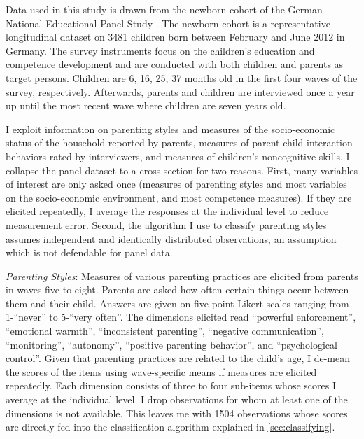 Data used in this study is drawn from the newborn cohort of the German National Educational Panel Study \parencite[NEPS][]{neps}. The newborn cohort is a representative longitudinal dataset on 3481 children born between February and June 2012 in Germany. The survey instruments focus on the children's education and competence development and are conducted with both children and parents as target persons. Children are 6, 16, 25, 37 months old in the first four waves of the survey, respectively. Afterwards, parents and children are interviewed once a year up until the most recent wave where children are seven years old. 

I exploit information on parenting styles and measures of the socio-economic status of the household reported by parents, measures of parent-child interaction behaviors rated by interviewers, and measures of children's noncognitive skills. I collapse the panel dataset to a cross-section for two reasons. First, many variables of interest are only asked once (measures of parenting styles and most variables on the socio-economic environment, and most competence measures). If they are elicited repeatedly, I average the responses at the individual level to reduce measurement error. Second, the algorithm I use to classify parenting styles assumes independent and identically distributed observations, an assumption which is not defendable for panel data.

\textit{Parenting Styles}: Measures of various parenting practices are elicited from parents in waves five to eight. Parents are asked how often certain things occur between them and their child. Answers are given on five-point Likert scales ranging from 1-``never'' to 5-``very often''. The dimensions elicited read ``powerful enforcement'', ``emotional warmth'', ``inconsistent parenting'', ``negative communication'', ``monitoring'', ``autonomy'', ``positive parenting behavior'', and ``psychological control''. Given that parenting practices are related to the child's age, I de-mean the scores of the items using wave-specific means if measures are elicited repeatedly. Each dimension consists of three to four sub-items whose scores I average at the individual level. I drop observations for whom at least one of the dimensions is not available. This leaves me with 1504 observations whose scores are directly fed into the classification algorithm explained in \ref{sec:classifying}.

